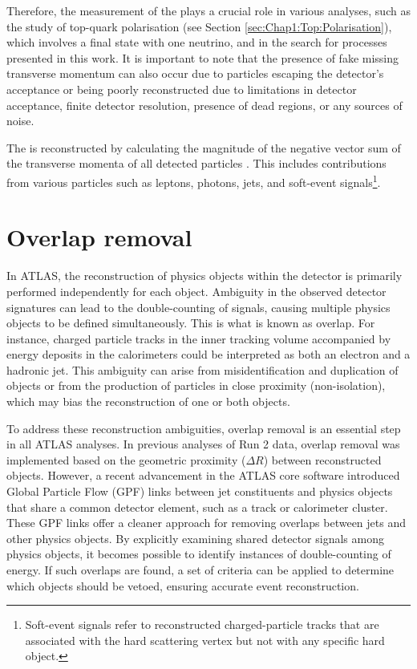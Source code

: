 Therefore, the measurement of the \MET plays a crucial role in various analyses, such as the 
study of top-quark polarisation (see Section \ref{sec:Chap1:Top:Polarisation}), which involves a 
final state with one neutrino, and in the search for \tHq processes presented in this work. 
It is important to note that the presence of fake missing transverse momentum can also occur due 
to particles escaping the detector's acceptance or being poorly reconstructed due to limitations in 
detector acceptance, finite detector resolution, presence of dead regions, or any sources of noise.

The \MET is reconstructed by calculating the magnitude of the negative vector sum 
of the transverse momenta of all detected particles\cite{ATLAS:2018txj} \cite{ATLAS:2018ghb}. 
This includes contributions from various particles such as leptons, photons, jets, and soft-event 
signals\footnote{Soft-event signals refer to reconstructed charged-particle tracks that 
are associated with the hard scattering vertex but not with any specific hard object.}.



\section{Overlap removal}
\label{sec:Chap3:Reco:OverlapRemoval}
In ATLAS, the reconstruction of physics objects within the detector is primarily 
performed independently for each object. 
Ambiguity in the observed detector signatures can lead to the double-counting 
of signals, causing multiple physics objects to be defined simultaneously. This
is what is known as overlap. 
For instance, charged particle tracks in the inner tracking volume accompanied by 
energy deposits in the calorimeters could be interpreted as both an electron and a hadronic jet.
This ambiguity can arise from misidentification and duplication of objects or from 
the production of particles in close proximity (non-isolation), which may bias the 
reconstruction of one or both objects.

To address these reconstruction ambiguities, overlap removal is an essential step in 
all ATLAS analyses. In previous analyses of Run 2 data, overlap removal was 
implemented based on the geometric proximity ($\Delta R$) between reconstructed 
objects. However, a recent advancement in the ATLAS core software introduced 
Global Particle Flow (GPF) links between jet constituents and physics objects that 
share a common detector element, such as a track or calorimeter cluster. These GPF links 
offer a cleaner approach for removing overlaps between jets and other physics objects. 
By explicitly examining shared detector signals among physics objects, it becomes possible to 
identify instances of double-counting of energy. If such overlaps are found, a set of criteria can 
be applied to determine which objects should be vetoed, ensuring accurate event reconstruction.









\begin{comment}
asdf
%
\end{comment}
